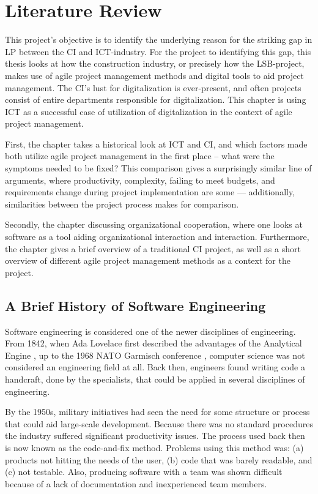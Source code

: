 
\chapter{Literature Review}
This project's objective is to identify the underlying reason for the striking gap in LP between the CI and ICT-industry. For the project to identifying this gap, this thesis looks at how the construction industry, or precisely how the LSB-project, makes use of agile project management methods and digital tools to aid project management. The CI's lust for digitalization is ever-present, and often projects consist of entire departments responsible for digitalization. This chapter is using ICT as a successful case of utilization of digitalization in the context of agile project management. 

First, the chapter takes a historical look at ICT and CI, and which factors made both utilize agile project management in the first place – what were the symptoms needed to be fixed? This comparison gives a surprisingly similar line of arguments, where productivity, complexity, failing to meet budgets, and requirements change during project implementation are some — additionally, similarities between the project process makes for comparison. 

Secondly, the chapter discussing organizational cooperation, where one looks at software as a tool aiding organizational interaction and interaction. Furthermore, the chapter gives a brief overview of a traditional CI project, as well as a short overview of different agile project management methods as a context for the project.

\section{A Brief History of Software Engineering} \label{sec:ICT_history}
Software engineering is considered one of the newer disciplines of engineering. From 1842, when Ada Lovelace first described the advantages of the Analytical Engine \cite{menabrea1842sketch}, up to the 1968 NATO Garmisch conference \cite{naur1969software}, computer science was not considered an engineering field at all. Back then, engineers found writing code a handcraft, done by the specialists, that could be applied in several disciplines of engineering. 

By the 1950s, military initiatives had seen the need for some structure or process that could aid large-scale development. Because there was no standard procedures the industry suffered significant productivity issues. The process used back then is now known as the code-and-fix method. Problems using this method was: (a) products not hitting the needs of the user, (b) code that was barely readable, and (c) not testable. Also, producing software with a team was shown difficult because of a lack of documentation and inexperienced team members. 

